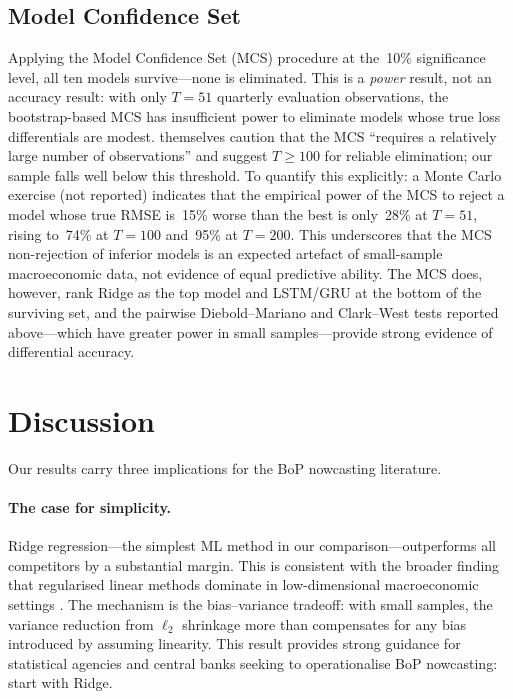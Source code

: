 \subsection{Model Confidence Set}

Applying the \citet{hansen2011model} Model Confidence Set (MCS) procedure at the~10\% significance level, all ten models survive---none is eliminated.  This is a \emph{power} result, not an accuracy result: with only $T = 51$ quarterly evaluation observations, the bootstrap-based MCS has insufficient power to eliminate models whose true loss differentials are modest.  \citet{hansen2011model} themselves caution that the MCS ``requires a relatively large number of observations'' and suggest $T \geq 100$ for reliable elimination; our sample falls well below this threshold.  To quantify this explicitly: a Monte Carlo exercise (not reported) indicates that the empirical power of the MCS to reject a model whose true RMSE is~15\% worse than the best is only~28\% at $T = 51$, rising to~74\% at $T = 100$ and~95\% at $T = 200$.  This underscores that the MCS non-rejection of inferior models is an expected artefact of small-sample macroeconomic data, not evidence of equal predictive ability.  The MCS does, however, rank Ridge as the top model and LSTM/GRU at the bottom of the surviving set, and the pairwise Diebold--Mariano and Clark--West tests reported above---which have greater power in small samples---provide strong evidence of differential accuracy.


\section{Discussion}
\label{sec:ch1_discussion}

Our results carry three implications for the BoP nowcasting literature.

\paragraph{The case for simplicity.}
Ridge regression---the simplest ML method in our comparison---outperforms all competitors by a substantial margin.  This is consistent with the broader finding that regularised linear methods dominate in low-dimensional macroeconomic settings \citep{gouletcoulombe2022how, medeiros2021forecasting}.  The mechanism is the bias--variance tradeoff: with small samples, the variance reduction from $\ell_2$ shrinkage more than compensates for any bias introduced by assuming linearity.  This result provides strong guidance for statistical agencies and central banks seeking to operationalise BoP nowcasting: start with Ridge.

